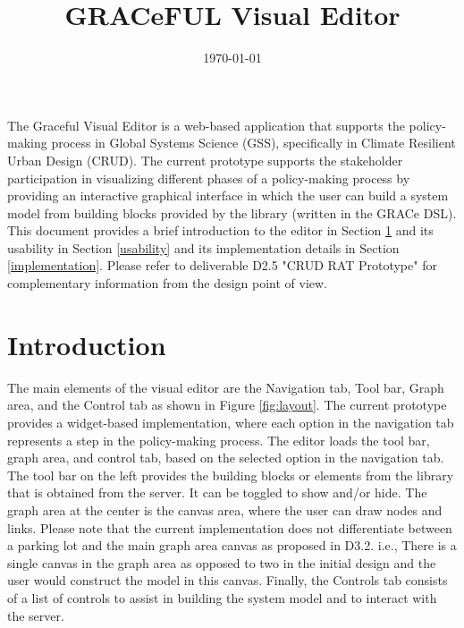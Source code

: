 \documentclass[a4paper]{article}
\title{GRACeFUL Visual Editor}
\date{\today}
\begin{document}
\maketitle

The Graceful Visual Editor is a web-based application that supports the policy-making process in Global Systems Science (GSS), specifically in Climate Resilient Urban Design (CRUD).
The current prototype supports the stakeholder participation in visualizing different phases of a policy-making process by providing an interactive graphical interface in which the user can build a system model from building blocks provided by the library (written in the GRACe DSL). This document provides a brief introduction to the editor in Section \ref{intro} and its usability in Section \ref{usability} and its implementation details in Section \ref{implementation}. Please refer to deliverable D2.5 "CRUD RAT Prototype" for complementary information from the design point of view.

\section{Introduction}
\label{intro}
The main elements of the visual editor are the Navigation tab, Tool bar, Graph area, and the Control tab as shown in Figure \ref{fig:layout}. The current prototype provides a widget-based implementation, where each option in the navigation tab represents a step in the policy-making process. The editor loads the tool bar, graph area, and control tab, based on the selected option in the navigation tab. The tool bar on the left provides the building blocks or elements from the library that is obtained from the server. It can be toggled to show and/or hide. The graph area at the center is the canvas area, where the user can draw nodes and links. Please note that the current implementation does not differentiate between a parking lot and the main graph area canvas as proposed in D3.2. i.e., There is a single canvas in the graph area as opposed to two in the initial design and the user would construct the model in this canvas. Finally, the Controls tab consists of a list of controls to assist in building the system model and to interact with the server.
\end{document}

